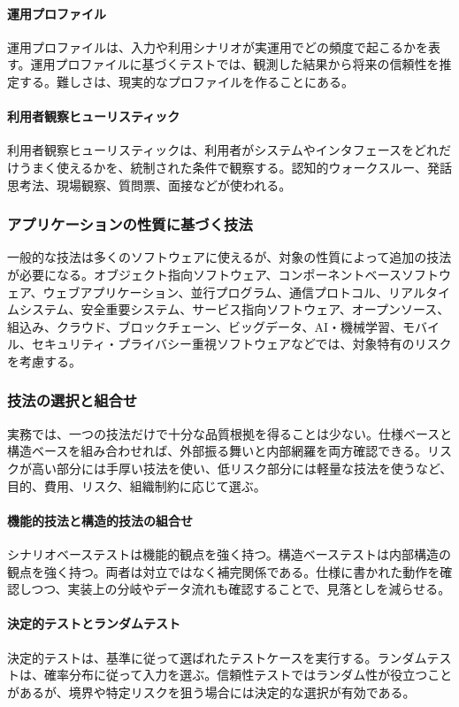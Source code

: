 \documentclass[a4paper,11pt]{ltjsarticle}
\numberwithin{figure}{section}
\numberwithin{table}{section}
\begin{document}
\paragraph{運用プロファイル}
運用プロファイルは、入力や利用シナリオが実運用でどの頻度で起こるかを表す。運用プロファイルに基づくテストでは、観測した結果から将来の信頼性を推定する。難しさは、現実的なプロファイルを作ることにある。

\paragraph{利用者観察ヒューリスティック}
利用者観察ヒューリスティックは、利用者がシステムやインタフェースをどれだけうまく使えるかを、統制された条件で観察する。認知的ウォークスルー、発話思考法、現場観察、質問票、面接などが使われる。

\subsubsection{アプリケーションの性質に基づく技法}
一般的な技法は多くのソフトウェアに使えるが、対象の性質によって追加の技法が必要になる。オブジェクト指向ソフトウェア、コンポーネントベースソフトウェア、ウェブアプリケーション、並行プログラム、通信プロトコル、リアルタイムシステム、安全重要システム、サービス指向ソフトウェア、オープンソース、組込み、クラウド、ブロックチェーン、ビッグデータ、AI・機械学習、モバイル、セキュリティ・プライバシー重視ソフトウェアなどでは、対象特有のリスクを考慮する。

\subsubsection{技法の選択と組合せ}
実務では、一つの技法だけで十分な品質根拠を得ることは少ない。仕様ベースと構造ベースを組み合わせれば、外部振る舞いと内部網羅を両方確認できる。リスクが高い部分には手厚い技法を使い、低リスク部分には軽量な技法を使うなど、目的、費用、リスク、組織制約に応じて選ぶ。

\paragraph{機能的技法と構造的技法の組合せ}
シナリオベーステストは機能的観点を強く持つ。構造ベーステストは内部構造の観点を強く持つ。両者は対立ではなく補完関係である。仕様に書かれた動作を確認しつつ、実装上の分岐やデータ流れも確認することで、見落としを減らせる。

\paragraph{決定的テストとランダムテスト}
決定的テストは、基準に従って選ばれたテストケースを実行する。ランダムテストは、確率分布に従って入力を選ぶ。信頼性テストではランダム性が役立つことがあるが、境界や特定リスクを狙う場合には決定的な選択が有効である。
\end{document}
